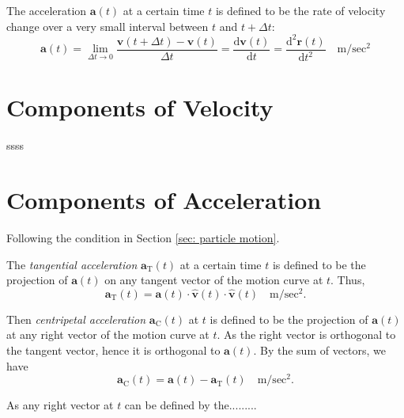 The acceleration $\mathbf a(t)$ at a certain time $t$ is defined to be the rate of velocity change over a very small interval between $t$ and $t + \Delta t$:
\begin{equation}
	\label{eq: acceleration}
	\mathbf a(t) = \lim_{\Delta t \to 0} \frac{\mathbf v(t + \Delta t) - \mathbf v(t)}{\Delta t} = \frac{\mathrm d \mathbf v(t)}{\mathrm d t} = \frac{\mathrm d^2 \mathbf r(t)}{\mathrm d t^2} \quad \mathrm{m/sec^2}
\end{equation}




\section{Components of Velocity}

ssss


\section{Components of Acceleration}

Following the condition in Section \ref{sec: particle motion}.

The \textit{tangential acceleration} $\mathbf a_\mathrm{T}(t)$ at a certain time $t$ is defined to be the projection of $\mathbf a(t)$ on any tangent vector of the motion curve at $t$. Thus,
\begin{equation}
	\label{eq: tangential acceleration}
	\mathbf a_\mathrm{T}(t) = \mathbf a(t) \cdot \mathbf{\hat v}(t) \cdot \mathbf{\hat v}(t) \quad \mathrm{m/sec^2}.
\end{equation}

Then \textit{centripetal acceleration} $\mathbf a_\mathrm{C}(t)$ at $t$ is defined to be the projection of $\mathbf a(t)$ at any right vector of the motion curve at $t$. As the right vector is orthogonal to the tangent vector, hence it is orthogonal to $\mathbf a(t)$. By the sum of vectors, we have
\begin{equation}
	\label{eq: centripetal acceleration}
	\mathbf a_{\mathrm C}(t) = \mathbf a(t) - \mathbf a_\mathrm{T}(t) \quad \mathrm{m / sec^2}.
\end{equation}

As any right vector at $t$ can be defined by the.........

























